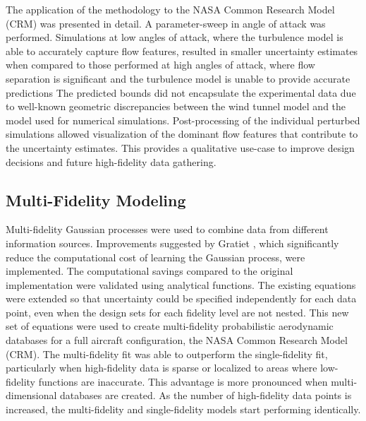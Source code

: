 The application of the methodology to the NASA Common Research Model (CRM) was presented in detail.
A parameter-sweep in angle of attack was performed.
Simulations at low angles of attack, where the turbulence model is able to accurately capture flow features, resulted in smaller uncertainty estimates when compared to those performed at high angles of attack, where flow separation is significant and the turbulence model is unable to provide accurate predictions
The predicted bounds did not encapsulate the experimental data due to well-known geometric discrepancies between the wind tunnel model and the model used for numerical simulations.
Post-processing of the individual perturbed simulations allowed visualization of the dominant flow features that contribute to the uncertainty estimates.
This provides a qualitative use-case to improve design decisions and future high-fidelity data gathering.

\subsection{Multi-Fidelity Modeling}

Multi-fidelity Gaussian processes were used to combine data from different information sources.
Improvements suggested by Gratiet \cite{gratiet_multi-fidelity_nodate}, which significantly reduce the computational cost of learning the Gaussian process, were implemented.
The computational savings compared to the original implementation \cite{kennedy_predicting_2000} were validated using analytical functions. 
The existing equations were extended so that uncertainty could be specified independently for each data point, even when the design sets for each fidelity level are not nested.
This new set of equations were used to create multi-fidelity probabilistic aerodynamic databases for a full aircraft configuration, the NASA Common Research Model (CRM).
The multi-fidelity fit was able to outperform the single-fidelity fit, particularly when high-fidelity data is sparse or localized to areas where low-fidelity functions are inaccurate.
This advantage is more pronounced when multi-dimensional databases are created.
As the number of high-fidelity data points is increased, the multi-fidelity and single-fidelity models start performing identically.

